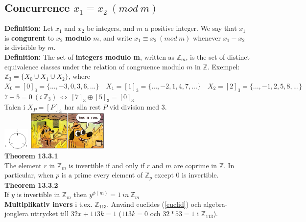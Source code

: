 \documentclass{article}
\begin{document}
\begin{multicols}{2}
\subsection{Concurrence $x_1 \equiv x_2 \ (mod \ m)$} \label{congur}
\textbf{Definition:} Let $x_1$ and $x_2$ be integers, and $m$ a positive integer. We say that $x_1$ is \textbf{congurent} to $x_2$ \textbf{modulo} $m$, and write $x_1 \equiv x_2 \ (mod \ m)$ whenever $x_1-x_2$ is divisible by $m$.\\
\newline
\textbf{Definition:} The set of \textbf{integers modulo m}, written as $\mathbb{Z}_m$, is the set of distinct equivalence classes under the relation of congruence modulo $m$ in $\mathbb{Z}$. Exempel: $\mathbb{Z}_3 = \{X_0 \cup X_1 \cup X_2\}$, where
$X_0 = [0]_3 = \{...,-3,0,3,6,...\} \quad X_1 = [1]_3 = \{...,-2,1,4,7,...\} \quad X_2 = [2]_3 = \{...,-1,2,5,8,...\}$ \quad $7+5=0 \ (i \ \mathbb{Z}_3) \ \iff \ [7]_3 \oplus [5]_3 = [0]_3$\\
\newline
Talen i $X_P = [P]_3$ har alla rest $P$ vid division med 3.\\
\includegraphics[width=0.095\textwidth]{mod}
\includegraphics[width=0.3\textwidth]{this_is_fine}\\
\textbf{Theorem 13.3.1}\\
The element $r$ in $\mathbb{Z}_m$ is invertible if and only if $r$ and $m$ are coprime in $\mathbb{Z}$. In particular, when $p$ is a prime every element of $\mathbb{Z}_p$ except 0 is invertible.\\
\newline
\textbf{Theorem 13.3.2}\\
If $y$ is invertible in $\mathbb{Z}_m$ then $y^{\phi(m)}=1 \ in \ \mathbb{Z}_m$\\
\newline
\textbf{Multiplikativ invers} i t.ex. $\mathbb{Z}_{113}$. Använd euclides (\ref{euclid}) och algebra-jonglera uttrycket till $32x + 113k = 1$ ($113k=0$ och $32*53=1$ i $\mathbb{Z}_{113}$).


\end{multicols}
\end{document}
